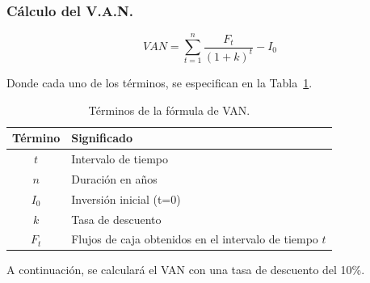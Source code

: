 {\begin{table}[H]
\begin{tabular}{|l|r|r|r|r|r|r|}
    \end{tabular}
\end{table}


\subsubsection{Cálculo del V.A.N.}

$$
VAN = \sum_{t=1}^{n} \frac{F_t}{(1 + k)^t} - I_0
$$

Donde cada uno de los términos, se especifican en la Tabla~\ref{tab:van_terminos}.


\begin{table}[H]
    \centering
    
    \caption{Términos de la fórmula de VAN.}
    
    \label{tab:van_terminos}
    
    \begin{tabular}{|c|l|}
    \hline
    \textbf{Término} & \textbf{Significado} \\
    \hline
    $t$ & Intervalo de tiempo \\
    \hline
    $n$ & Duración en años \\
    \hline
    $I_0$ & Inversión inicial (t=0) \\
    \hline
    $k$ & Tasa de descuento \\ %
    \hline
    $F_t$ & Flujos de caja obtenidos en el intervalo de tiempo $t$ \\ %
    \hline
    \end{tabular}
\end{table}

A continuación, se calculará el VAN con una tasa de descuento del 10\%.


\begin{table}[H]

    \centering
    

\end{table}}
